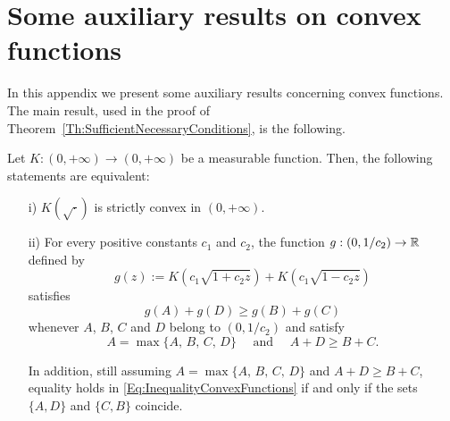 \section{Some auxiliary results on convex functions}
\label{Sec:AuxiliaryResults}

In this appendix we present some auxiliary results concerning convex functions. The main result, used in the proof of Theorem~\ref{Th:SufficientNecessaryConditions}, is the following.



\begin{proposition}
	\label{Prop:EquivalenceK(sqrt)Convex<->Inequality}
	Let $K:(0, +\infty) \to (0,+\infty)$ be a measurable function. Then, the following statements are equivalent:
	\begin{enumerate}
		\item[i)] $K(\sqrt{\cdot})$ is strictly convex in $(0, +\infty)$.
		\item[ii)] For every positive constants $c_1$ and $c_2$, the function $g:(0,1/c_2)\to \mathbb{R}$ defined by
		\begin{equation}
		\label{Eq:DefinitiongFromK}
		g(z) := K(c_1 \sqrt{1 + c_2z}) + K(c_1 \sqrt{1 - c_2z})
		\end{equation}
		satisfies 
		\begin{equation}
		\label{Eq:InequalityConvexFunctions}
		g(A) + g(D) \geq g(B) + g(C)
		\end{equation}
		whenever $A$, $B$, $C$ and $D$ belong to $(0, 1/c_2)$ and satisfy
		$$
		A = \max\{A,\, B,\, C,\, D\} \quad \text{ and } \quad A + D \geq B + C.
		$$
		
		In addition, still assuming $A = \max\{A,\, B,\, C,\, D\}$ and $A + D \geq B + C$, equality holds in \eqref{Eq:InequalityConvexFunctions} if and only if the sets $\{A,D\}$ and $\{C,B\}$ coincide.	
	\end{enumerate}
\end{proposition}



